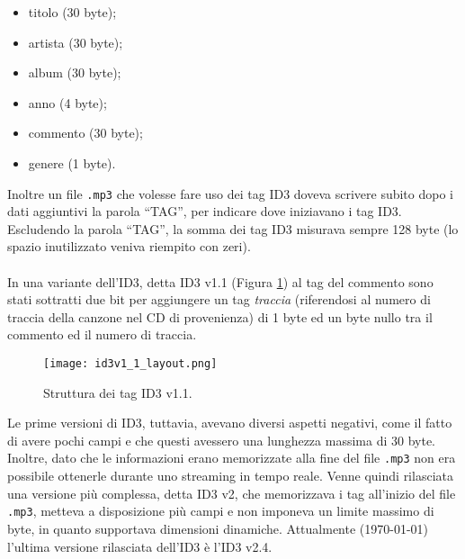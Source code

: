 		\begin{itemize}
			\item titolo (30 byte);
			\item artista (30 byte);
			\item album (30 byte);
			\item anno (4 byte);
			\item commento (30 byte);
			\item genere (1 byte).
		\end{itemize}
		
		Inoltre un file \texttt{.mp3} che volesse fare uso dei tag ID3 doveva scrivere subito dopo i dati aggiuntivi la parola ``TAG'', per indicare dove iniziavano i tag ID3. Escludendo la parola ``TAG'', la somma dei tag ID3 misurava sempre 128 byte (lo spazio inutilizzato veniva riempito con zeri).\\
		\\
		In una variante dell'ID3, detta ID3 v1.1 (Figura \ref{fig:id3v1_1_layout}) al tag del commento sono stati sottratti due bit per aggiungere un tag \textit{traccia} (riferendosi al numero di traccia della canzone nel CD di provenienza) di 1 byte ed un byte nullo tra il commento ed il numero di traccia.\\
		
		\begin{figure}[h!]
			\centering
				\texttt{[image: id3v1\_1\_layout.png]}
			\caption{Struttura dei tag ID3 v1.1.}
			\label{fig:id3v1_1_layout}
		\end{figure}
		
		Le prime versioni di ID3, tuttavia, avevano diversi aspetti negativi, come il fatto di avere pochi campi e che questi avessero una lunghezza massima di 30 byte. Inoltre, dato che le informazioni erano memorizzate alla fine del file \texttt{.mp3} non era possibile ottenerle durante uno streaming in tempo reale. Venne quindi rilasciata una versione più complessa, detta ID3 v2, che memorizzava i tag all'inizio del file \texttt{.mp3}, metteva a disposizione più campi e non imponeva un limite massimo di byte, in quanto supportava dimensioni dinamiche. Attualmente (\monthyear\today) l'ultima versione rilasciata dell'ID3 è l'ID3 v2.4.